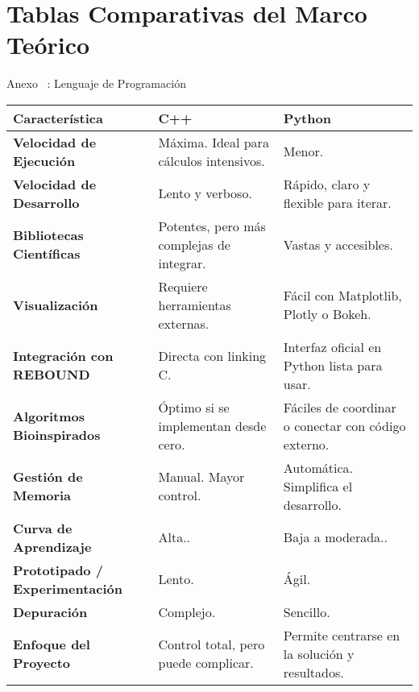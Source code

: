 \section{Tablas Comparativas del Marco Teórico}

\begin{frame}{Anexo \thesection~: Lenguaje de Programación}
    \centering
    \label{tab:comparativa}
    \vspace{-0.1cm}
    \begin{adjustbox}{max width=0.9\textwidth,max height=0.7\textheight, keepaspectratio}
        \renewcommand{\arraystretch}{1.3}
            \begin{tabular}{@{}>{\bfseries}p{} p{} >{\columncolor{yellow!30}}p{}@{}}
            \toprule
            \textbf{Característica} & \textbf{C++} & \textbf{Python} \\
            \midrule
            Velocidad de Ejecución & Máxima. Ideal para cálculos intensivos. & Menor. \\
            Velocidad de Desarrollo & Lento y verboso. & Rápido, claro y flexible para iterar. \\
            Bibliotecas Científicas & Potentes, pero más complejas de integrar. & Vastas y accesibles. \\
            Visualización & Requiere herramientas externas. & Fácil con Matplotlib, Plotly o Bokeh. \\
            Integración con REBOUND & Directa con linking C. & Interfaz oficial en Python lista para usar. \\
            Algoritmos Bioinspirados & Óptimo si se implementan desde cero. & Fáciles de coordinar o conectar con código externo. \\
            Gestión de Memoria & Manual. Mayor control. & Automática. Simplifica el desarrollo. \\
            Curva de Aprendizaje & Alta.. & Baja a moderada.. \\
            Prototipado / Experimentación & Lento. & Ágil. \\
            Depuración & Complejo. & Sencillo. \\
            Enfoque del Proyecto & Control total, pero puede complicar. & Permite centrarse en la solución y resultados. \\
            \bottomrule
            \end{tabular}
    \end{adjustbox}
    \smallskip
\end{frame}


